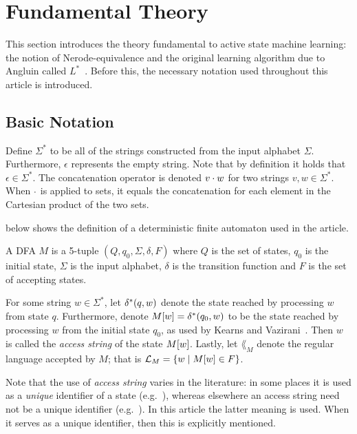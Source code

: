 \section{Fundamental Theory}
\label{sec:fundamental-theory}
This section introduces the theory fundamental to active state machine learning:
the notion of Nerode-equivalence and the original learning algorithm due to
Angluin called $L^*$~\cite{Angluin1987}. Before this, the necessary notation used
throughout this article is introduced.

\subsection{Basic Notation}
\label{sec:basic-notation}

Define $\Sigma^*$ to be all of the strings constructed from the input alphabet
$\Sigma$. Furthermore, $\epsilon$ represents the empty string. Note that by
definition it holds that $\epsilon \in \Sigma^*$. The concatenation operator is
denoted $v \cdot w$ for two strings $v,w \in \Sigma^*$. When $\cdot$ is
applied to sets, it equals the concatenation for each element in the Cartesian
product of the two sets.

 below shows the definition of a deterministic finite automaton
used in the article.

\begin{definition}\label{def:dfa}
  A DFA $M$ is a 5-tuple $(Q, q_0, \Sigma, \delta, F)$ where $Q$ is the set of
  states, $q_0$ is the initial state, $\Sigma$ is the input alphabet, $\delta$
  is the transition function and $F$ is the set of accepting states.
\end{definition}

For some string $w \in \Sigma^*$, let $\delta^*(q,w)$ denote the state reached by
processing $w$ from state $q$. Furthermore, denote
$M[w] = \delta^*(q_0,w)$ to be the state reached by processing $w$ from
the initial state $q_0$, as used by Kearns and Vazirani~\cite{Kearns1994}. Then
$w$ is called the \textit{access string} of the state $M[w]$. Lastly, let
$\lang_M$ denote the regular language accepted by $M$; that is
$\mathcal{L}_M = \{ w \mid M[w] \in F \}$.

Note that the use of \textit{access string} varies in the literature: in some
places it is used as a \textit{unique} identifier of a state
(e.g.~\cite{Isberner2015a,Isberner2014a}), whereas elsewhere an access string
need not be a unique identifier (e.g.~\cite{Howar2014}). In this article the
latter meaning is used. When it serves as a unique identifier, then this is
explicitly mentioned.

